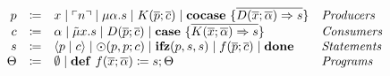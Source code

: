 \begin{definition}
    \[
      \begin{array}{rcll}
        p & \coloneqq & x \mid \ulcorner n \urcorner \mid \mu\alpha.s \mid K(\overline{p}; \overline{c}) \mid \mathbf{cocase}\ \{ \overline{D(\overline{x};\overline{\alpha}) \Rightarrow s} \} & \emph{Producers}\\
        c & \coloneqq & \alpha \mid \tilde{\mu}x.s \mid D(\overline{p}; \overline{c}) \mid \mathbf{case}\ \{ \overline{K(\overline{x}; \overline{\alpha}) \Rightarrow s} \}& \emph{Consumers}\\
        s & \coloneqq & \langle p \mid c \rangle \mid \odot(p, p; c) \mid \mathbf{ifz}(p, s, s) \mid f(\overline{p}; \overline{c}) \mid \mathbf{done} & \emph{Statements}\\
        \Theta & \coloneqq & \emptyset \mid \mathbf{def}\ f(\overline{x}; \overline{\alpha}) \coloneq s; \Theta & \emph{Programs}\\
      \end{array}
    \]
  \end{definition}
